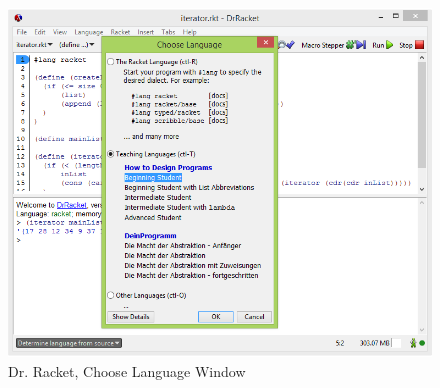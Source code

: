 \begin{figure}[H]
\begin{center}
\includegraphics[scale=0.59]{./pics/drracketchooselang.png}
\caption{Dr. Racket, Choose Language Window}
\label{fig:dr_racket_choose_langs}
\end{center}
\end{figure}


